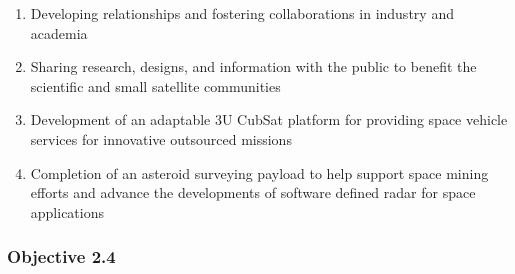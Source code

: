 \documentclass[nocover]            %
{CSLI}                       %
\begin{document}
\begin{enumerate}
\item{Developing relationships and fostering collaborations in industry and academia}
\item{Sharing research, designs, and information with the public to benefit the scientific and small satellite communities}
\item{Development of an adaptable 3U CubSat platform for providing space vehicle services for innovative outsourced missions}
\item{Completion of an asteroid surveying payload to help support space mining efforts and advance the developments of software defined radar for space applications}
\end{enumerate}

\subsubsection{Objective 2.4}
\end{document}
